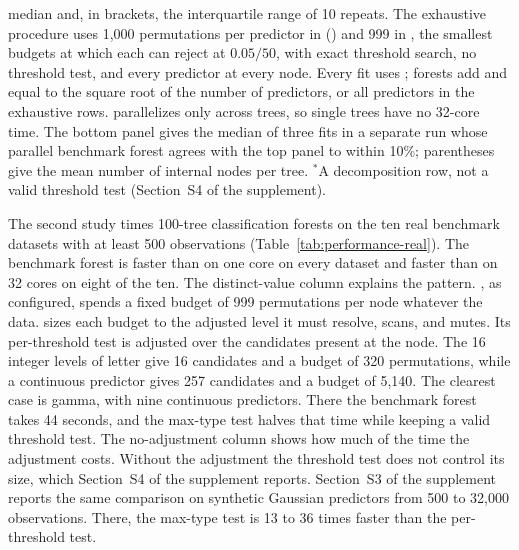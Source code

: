 \documentclass[article]{jss}
\newcommand{\citrees}{\pkg{citrees}\xspace}
\begin{document}
\begin{table}[t!]
{median and, in brackets, the interquartile range of 10 repeats. The exhaustive procedure uses 1,000 permutations per
predictor in \citrees () and 999
in , the smallest budgets at which each can reject at
$0.05/50$, with exact threshold search, no threshold test, and every
predictor at every node. Every  fit uses
; forests add  and  equal to the square root of the number of
predictors, or all predictors in the exhaustive rows. 
parallelizes only across trees, so single trees have no 32-core time. The
bottom panel gives the median of three fits in a separate run whose parallel
benchmark forest agrees with the top panel to within 10\%; parentheses give
the mean number of internal nodes per tree. $^{\ast}$A decomposition row, not
a valid threshold test (Section~S4 of the supplement).}
\label{tab:performance-reference}
\label{tab:performance-decomposition}
\end{table}

The second study times 100-tree classification forests on the ten real
benchmark datasets with at least 500 observations
(Table~\ref{tab:performance-real}). The benchmark \citrees forest is faster
than  on one core on every dataset and faster than
 on 32 cores on eight of the ten. The distinct-value column
explains the pattern. , as configured, spends a fixed budget of
999 permutations per node whatever the data. \citrees sizes each budget to the
adjusted level it must resolve, scans, and mutes. Its per-threshold test is
adjusted over the candidates present at the node. The 16 integer levels of
letter give 16 candidates and a budget of 320 permutations, while a
continuous predictor gives 257 candidates and a budget of 5,140. The clearest
case is gamma, with nine continuous predictors. There the benchmark forest
takes 44 seconds, and the max-type test halves that time while keeping a
valid threshold test. The no-adjustment column shows how much of the time the
adjustment costs. Without the adjustment the threshold test does not control
its size, which Section~S4 of the supplement reports. Section~S3 of the supplement
reports the same comparison on synthetic Gaussian predictors from 500 to
32,000 observations. There, the max-type test is 13 to 36 times faster than
the per-threshold test.
\end{document}
